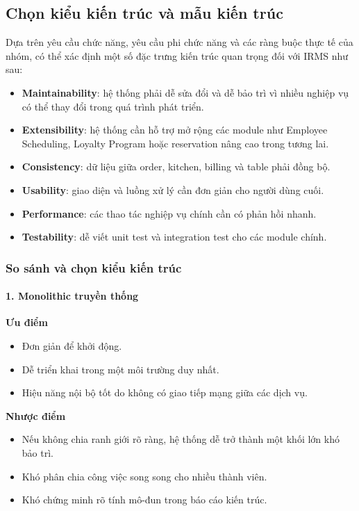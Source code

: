 \documentclass[12pt,a4paper]{article}
\begin{document}
\subsection{Chọn kiểu kiến trúc và mẫu kiến trúc}

Dựa trên yêu cầu chức năng, yêu cầu phi chức năng và các ràng buộc thực tế của nhóm, có thể xác định một số đặc trưng kiến trúc quan trọng đối với IRMS như sau:
\begin{itemize}
    \item \textbf{Maintainability}: hệ thống phải dễ sửa đổi và dễ bảo trì vì nhiều nghiệp vụ có thể thay đổi trong quá trình phát triển.
    \item \textbf{Extensibility}: hệ thống cần hỗ trợ mở rộng các module như Employee Scheduling, Loyalty Program hoặc reservation nâng cao trong tương lai.
    \item \textbf{Consistency}: dữ liệu giữa order, kitchen, billing và table phải đồng bộ.
    \item \textbf{Usability}: giao diện và luồng xử lý cần đơn giản cho người dùng cuối.
    \item \textbf{Performance}: các thao tác nghiệp vụ chính cần có phản hồi nhanh.
    \item \textbf{Testability}: dễ viết unit test và integration test cho các module chính.
\end{itemize}

\subsubsection{So sánh và chọn kiểu kiến trúc}

\paragraph{1. Monolithic truyền thống}
\noindent\textbf{Ưu điểm}\par
\begin{itemize}
    \item Đơn giản để khởi động.
    \item Dễ triển khai trong một môi trường duy nhất.
    \item Hiệu năng nội bộ tốt do không có giao tiếp mạng giữa các dịch vụ.
\end{itemize}

\noindent\textbf{Nhược điểm}\par
\begin{itemize}
    \item Nếu không chia ranh giới rõ ràng, hệ thống dễ trở thành một khối lớn khó bảo trì.
    \item Khó phân chia công việc song song cho nhiều thành viên.
    \item Khó chứng minh rõ tính mô-đun trong báo cáo kiến trúc.
\end{itemize}
\end{document}
